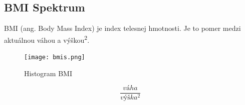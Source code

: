 \subsection{BMI Spektrum}

BMI (ang. Body Mass Index) je index telesnej hmotnosti. Je to pomer medzi aktuálnou váhou a výškou\textsuperscript 2.

\begin{figure}[h!]
	\centering
  		\texttt{[image: bmis.png]}
  	\caption{Histogram BMI}
  	\label{fig:hist-bmi}
\end{figure}

\begin{equation}
	\frac{váha}{výška^2}
\end{equation}













































